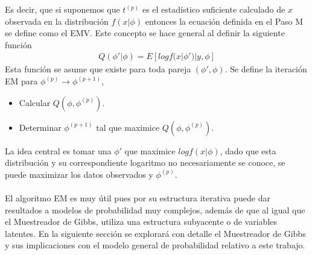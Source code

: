 Es decir, que si suponemos que $t^{(p)}$ es el estad\'istico suficiente calculado de $x$ observada en la distribuci\'on $f(x|\phi)$ entonces la ecuaci\'on definida en el Paso M se define como el EMV. Este concepto se hace general al definir la siguiente funci\'on
\begin{align*}
Q(\phi'|\phi)=E[log f(x|\phi')|y,\phi]
\end{align*}
Esta funci\'on se asume que existe para toda pareja $(\phi',\phi)$. Se define la iteraci\'on EM para $\phi^{(p)} \to \phi^{(p+1)}$,
\begin{itemize}
\item Calcular $Q(\phi,\phi^{(p)})$.
\item Determinar $\phi^{(p+1)}$ tal que maximice $Q(\phi,\phi^{(p)})$.
\end{itemize}
La idea central es tomar una $\phi'$ que maximice $log f(x|\phi)$, dado que esta distribuci\'on y su correspondiente logaritmo no necesariamente se conoce, se puede maximizar los datos observados y $\phi^{(p)}$.\\
\\
El algoritmo EM es muy \'util pues por su estructura iterativa puede dar resultados a modelos de probabilidad muy complejos, adem\'as de que al igual que el Muestreador de Gibbs, utiliza una estructura subyacente o de variables latentes. En la siguiente secci\'on se explorar\'a con detalle el Muestreador de Gibbs y sus implicaciones con el modelo general de probabilidad relativo a este trabajo.

